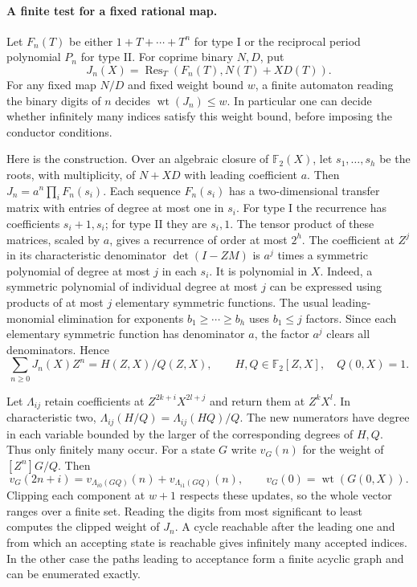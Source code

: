 \documentclass[11pt]{article}
\begin{document}
\paragraph{A finite test for a fixed rational map.}
Let \(F_n(T)\) be either \(1+T+\cdots+T^n\) for type I or the
reciprocal period polynomial \(P_n\) for type II. For coprime binary
\(N,D\), put
\[
         J_n(X)=\operatorname{Res}_T(F_n(T),N(T)+X D(T)).
\]
For any fixed map \(N/D\) and fixed weight bound \(w\), a finite
automaton reading the binary digits of \(n\) decides
\(\operatorname{wt}(J_n)\le w\). In particular one can decide whether
infinitely many indices satisfy this weight bound, before imposing
the conductor conditions.

Here is the construction. Over an algebraic closure of
\(\mathbb F_2(X)\), let \(s_1,\ldots,s_h\) be the roots, with
multiplicity, of \(N+XD\) with leading coefficient \(a\). Then
\(J_n=a^n\prod_i F_n(s_i)\). Each sequence \(F_n(s_i)\) has a
two-dimensional transfer matrix with entries of degree at most one
in \(s_i\). For type I the recurrence has coefficients \(s_i+1,s_i\);
for type II they are \(s_i,1\). The tensor product of these matrices,
scaled by \(a\), gives a recurrence of order at most \(2^h\).
The coefficient at \(Z^j\) in its characteristic denominator
\(\det(I-ZM)\) is \(a^j\) times a symmetric polynomial of degree
at most \(j\) in each \(s_i\). It is polynomial in \(X\).
Indeed, a symmetric polynomial of individual degree at most \(j\)
can be expressed using products of at most \(j\) elementary symmetric
functions. The usual leading-monomial elimination for exponents
\(b_1\ge\cdots\ge b_h\) uses \(b_1\le j\) factors. Since each elementary
symmetric function has denominator \(a\), the factor \(a^j\) clears
all denominators. Hence
\[
        \sum_{n\ge0} J_n(X)Z^n=H(Z,X)/Q(Z,X),
        \qquad H,Q\in\mathbb F_2[Z,X],\quad Q(0,X)=1 .
\]

Let \(\Lambda_{ij}\) retain coefficients at \(Z^{2k+i}X^{2l+j}\)
and return them at \(Z^kX^l\). In characteristic two,
\(\Lambda_{ij}(H/Q)=\Lambda_{ij}(HQ)/Q\). The new numerators have
degree in each variable bounded by the larger of the corresponding
degrees of \(H,Q\). Thus only finitely many occur. For a state \(G\)
write \(v_G(n)\) for the weight of \([Z^n]G/Q\). Then
\[
 v_G(2n+i)=v_{\Lambda_{i0}(GQ)}(n)+v_{\Lambda_{i1}(GQ)}(n),
 \qquad v_G(0)=\operatorname{wt}(G(0,X)).
\]
Clipping each component at \(w+1\) respects these updates, so the
whole vector ranges over a finite set. Reading the digits from most
significant to least computes the clipped weight of \(J_n\). A cycle
reachable after the leading one and from which an accepting state is
reachable gives infinitely many accepted indices. In the other case
the paths leading to acceptance form a finite acyclic graph and can
be enumerated exactly.
\end{document}
